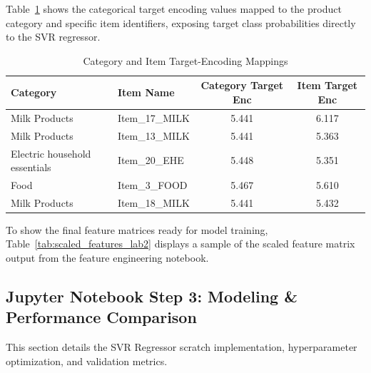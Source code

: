 \documentclass[12pt,a4paper]{article}
\begin{document}
Table~\ref{tab:target_enc} shows the categorical target encoding values mapped to the product category and specific item identifiers, exposing target class probabilities directly to the SVR regressor.
\begin{table}[H]
\centering
\caption{Category and Item Target-Encoding Mappings}
\label{tab:target_enc}
\begin{tabular}{llcc}
\toprule
\textbf{Category} & \textbf{Item Name} & \textbf{Category Target Enc} & \textbf{Item Target Enc} \\
\midrule
Milk Products & Item\_17\_MILK & 5.441 & 6.117 \\
Milk Products & Item\_13\_MILK & 5.441 & 5.363 \\
Electric household essentials & Item\_20\_EHE & 5.448 & 5.351 \\
Food & Item\_3\_FOOD & 5.467 & 5.610 \\
Milk Products & Item\_18\_MILK & 5.441 & 5.432 \\
\bottomrule
\end{tabular}
\end{table}

To show the final feature matrices ready for model training, Table~\ref{tab:scaled_features_lab2} displays a sample of the scaled feature matrix output from the feature engineering notebook.
\begin{table}[H]
\centering
\caption{Preprocessed and Scaled Feature Matrix Output (Sample)}
\label{tab:scaled_features_lab2}
\end{table}

\subsection{Jupyter Notebook Step 3: Modeling \& Performance Comparison}
This section details the SVR Regressor scratch implementation, hyperparameter optimization, and validation metrics.
\end{document}
